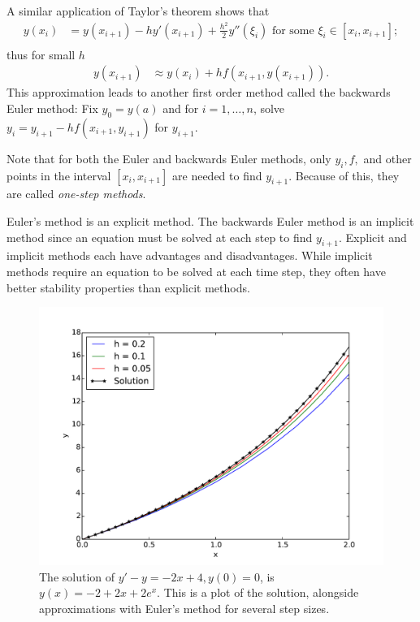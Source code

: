 A similar application of Taylor's theorem shows that
\begin{align*}
y(x_{i}) &= y(x_{i+1}) - h y'(x_{i+1}) + \frac{h^2}{2} y''(\xi_i) \text{ for some } \xi_i \in [x_i,x_{i+1}]; \\
\end{align*}
thus for small $h$
\begin{align*}
y(x_{i+1}) &\approx  y(x_{i}) + h f(x_{i+1},y(x_{i+1})).
\end{align*}
This approximation leads to another first order method called the backwards Euler method: Fix $y_0 = y(a)$ and for $i = 1, \hdots, n$, solve  $y_{i} = y_{i+1}-hf(x_{i+1},y_{i+1})$ for $y_{i+1}$.

Note that for both the Euler and backwards Euler methods, only $y_i, f,$ and other points in the interval $[x_i, x_{i+1}]$ are needed to find $y_{i+1}$. 
Because of this, they are called \textit{one-step methods}.

Euler's method is an explicit method. 
The backwards Euler method is an implicit method since an equation must be solved at each step to find $y_{i+1}$. 
Explicit and implicit methods each have advantages and disadvantages. 
While implicit methods require an equation to be solved at each time step, they often have better stability properties than explicit methods.

\begin{figure}[ht]
\centering
\includegraphics[width=\textwidth]{Fig1.pdf}
\caption{The solution of $y' -y= -2x+4, y(0) = 0$, is $y(x) = -2+2x + 2e^x.$ This is a plot of the solution, alongside approximations with Euler's method for several step sizes.}
\label{ivp:euler}
\end{figure}

